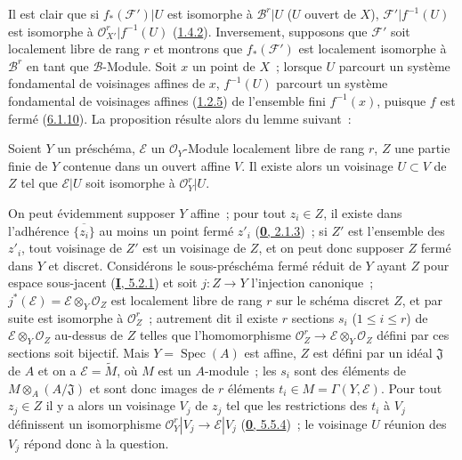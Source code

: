 Il est clair que si $f_*(\mathcal{F}')|U$ est isomorphe à
$\mathcal{B}^r|U$ ($U$ ouvert de $X$), $\mathcal{F}'|f^{-1}(U)$ est isomorphe
à $\mathcal{O}_{X'}^r|f^{-1}(U)$
(\hyperref[II.1.4.2-fr]{1.4.2}). Inversement, supposons que $\mathcal{F}'$
soit localement libre de rang $r$ et montrons que $f_*(\mathcal{F}')$ est
localement isomorphe à $\mathcal{B}^r$ en tant que $\mathcal{B}$-Module. Soit
$x$ un point de $X$~; lorsque $U$ parcourt un système fondamental de
voisinages affines de $x$, $f^{-1}(U)$ parcourt un système fondamental de
voisinages affines (\hyperref[II.1.2.5-fr]{1.2.5}) de l'ensemble fini
$f^{-1}(x)$, puisque $f$ est fermé
(\hyperref[II.6.1.10-fr]{6.1.10}). La proposition résulte alors du lemme
suivant~:

\begin{lemma}[6.1.12.1]
\label{II.6.1.12.1-fr}
Soient $Y$ un préschéma, $\mathcal{E}$ un $\mathcal{O}_Y$-Module localement
libre de rang $r$, $Z$ une partie finie de $Y$ contenue dans un ouvert affine
$V$. Il existe alors un voisinage $U\subset V$ de $Z$ tel que
$\mathcal{E}|U$ soit isomorphe à $\mathcal{O}_Y^r|U$.
\end{lemma}

On peut évidemment supposer $Y$ affine~; pour tout $z_i\in Z$, il existe dans
l'adhérence $\overline{\{z_i\}}$ au moins un point fermé $z'_i$
(\hyperref[0.2.1.3-fr]{\textbf{0}, 2.1.3})~; si $Z'$ est l'ensemble des $z'_i$, tout
voisinage de $Z'$ est un voisinage de $Z$, et on peut donc supposer $Z$ fermé
dans $Y$ et discret. Considérons le sous-préschéma fermé réduit de $Y$ ayant
$Z$ pour espace sous-jacent (\hyperref[I.5.2.1-fr]{\textbf{I}, 5.2.1}) et soit
$j:Z\to Y$ l'injection canonique~; $j^*(\mathcal{E})=\mathcal{E}\otimes_Y
\mathcal{O}_Z$ est localement libre de rang $r$ sur le schéma discret $Z$,
et par suite est isomorphe à $\mathcal{O}_Z^r$~; autrement dit il existe $r$
sections $s_i$ ($1\leq i\leq r$) de $\mathcal{E}\otimes_Y\mathcal{O}_Z$
au-dessus de $Z$ telles que l'homomorphisme
$\mathcal{O}_Z^r\to\mathcal{E}\otimes_Y\mathcal{O}_Z$ défini par ces sections
soit bijectif. Mais $Y=\operatorname{Spec}(A)$ est affine, $Z$ est défini par
un idéal $\mathfrak{J}$ de $A$ et on a $\mathcal{E}=\widetilde{M}$, où $M$
est un $A$-module~; les $s_i$ sont des éléments
de $M\otimes_A(A/\mathfrak{J})$ et sont donc images de $r$ éléments
$t_i\in M=\Gamma(Y,\mathcal{E})$. Pour tout $z_j\in Z$ il y a alors un
voisinage $V_j$ de $z_j$ tel que les restrictions des $t_i$ à $V_j$
définissent un isomorphisme
$\mathcal{O}_Y^r|V_j\to\mathcal{E}|V_j$
(\hyperref[0.5.5.4-fr]{\textbf{0}, 5.5.4})~; le voisinage $U$ réunion des $V_j$ répond
donc à la question.

